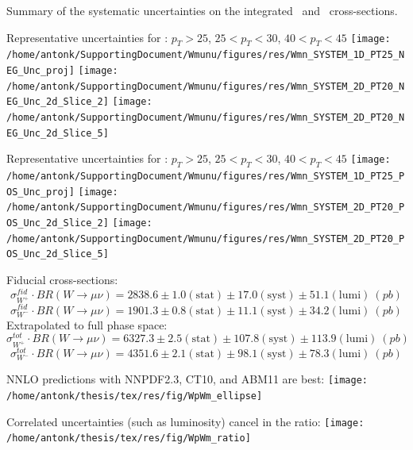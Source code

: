 {

\begin{table}
  \scriptsize
  \begin{center}
  
    \caption{Summary of the systematic uncertainties on the integrated  \Wmunum\ and \Wmunup\ cross-sections.}
  \end{center}
\end{table}

}

{

Representative uncertainties for : $p_{T}>25$, $25<p_{T}<30$, $40<p_{T}<45$
\texttt{[image: /home/antonk/SupportingDocument/Wmunu/figures/res/Wmn\_SYSTEM\_1D\_PT25\_NEG\_Unc\_proj]}
\texttt{[image: /home/antonk/SupportingDocument/Wmunu/figures/res/Wmn\_SYSTEM\_2D\_PT20\_NEG\_Unc\_2d\_Slice\_2]}
\texttt{[image: /home/antonk/SupportingDocument/Wmunu/figures/res/Wmn\_SYSTEM\_2D\_PT20\_NEG\_Unc\_2d\_Slice\_5]}

Representative uncertainties for : $p_{T}>25$, $25<p_{T}<30$, $40<p_{T}<45$
\texttt{[image: /home/antonk/SupportingDocument/Wmunu/figures/res/Wmn\_SYSTEM\_1D\_PT25\_POS\_Unc\_proj]}
\texttt{[image: /home/antonk/SupportingDocument/Wmunu/figures/res/Wmn\_SYSTEM\_2D\_PT20\_POS\_Unc\_2d\_Slice\_2]}
\texttt{[image: /home/antonk/SupportingDocument/Wmunu/figures/res/Wmn\_SYSTEM\_2D\_PT20\_POS\_Unc\_2d\_Slice\_5]}

}

{
\footnotesize{
Fiducial cross-sections:
$$\sigma^{fid}_{W^+}\cdot BR(W \rightarrow \mu\nu) = 2838.6 \pm 1.0 (\text{stat}) \pm 17.0 (\text{syst}) \pm 51.1 (\text{lumi})\ (pb)$$
$$\sigma^{fid}_{W^-}\cdot BR(W \rightarrow \mu\nu) = 1901.3 \pm 0.8 (\text{stat}) \pm 11.1 (\text{syst}) \pm 34.2 (\text{lumi})\ (pb)$$
Extrapolated to full phase space:
$$\sigma^{tot}_{W^+}\cdot BR(W \rightarrow \mu\nu) = 6327.3 \pm 2.5 (\text{stat}) \pm 107.8 (\text{syst}) \pm 113.9 (\text{lumi})\ (pb)$$
$$\sigma^{tot}_{W^-}\cdot BR(W \rightarrow \mu\nu) = 4351.6 \pm 2.1 (\text{stat}) \pm 98.1 (\text{syst}) \pm 78.3 (\text{lumi})\ (pb)$$
}

\centering
\small{NNLO predictions with NNPDF2.3, CT10, and ABM11 are best:}
\colb[T]
\centering
\texttt{[image: /home/antonk/thesis/tex/res/fig/WpWm\_ellipse]}

\vspace{.1cm}
\centering
Correlated uncertainties (such as luminosity) cancel in the ratio:
\texttt{[image: /home/antonk/thesis/tex/res/fig/WpWm\_ratio]}
\cole
}


